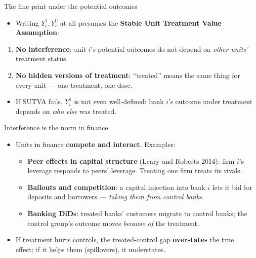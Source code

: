 \documentclass[
  11pt,
  ignorenonframetext,
  aspectratio=169,
]{beamer}
\providecommand{\tightlist}{%
  \setlength{\itemsep}{0pt}\setlength{\parskip}{0pt}}
\begin{document}
\begin{frame}{The fine print under the potential outcomes}
\protect{}\label{the-fine-print-under-the-potential-outcomes}
\begin{itemize}
\tightlist
\item
  Writing \(Y_i^1, Y_i^0\) at all presumes the \textbf{Stable Unit
  Treatment Value Assumption}:
\end{itemize}

\begin{enumerate}
\tightlist
\item
  \textbf{No interference}: unit \(i\)'s potential outcomes do not
  depend on \emph{other units'} treatment status.
\item
  \textbf{No hidden versions of treatment}: ``treated'' means the same
  thing for every unit --- one treatment, one dose.
\end{enumerate}

\begin{itemize}
\tightlist
\item
  If SUTVA fails, \(Y_i^1\) is not even well-defined: bank \(i\)'s
  outcome under treatment depends on \emph{who else} was treated.
\end{itemize}
\end{frame}

\begin{frame}{Interference is the norm in finance}
\protect{}\label{interference-is-the-norm-in-finance}
\begin{itemize}
\tightlist
\item
  Units in finance \textbf{compete and interact}. Examples:

  \begin{itemize}
  \tightlist
  \item
    \textbf{Peer effects in capital structure} (Leary and Roberts 2014):
    firm \(i\)'s leverage responds to peers' leverage. Treating one firm
    treats its rivals.
  \item
    \textbf{Bailouts and competition}: a capital injection into bank
    \(i\) lets it bid for deposits and borrowers --- \emph{taking them
    from control banks}.
  \item
    \textbf{Banking DiDs}: treated banks' customers migrate to control
    banks; the control group's outcome moves \emph{because of} the
    treatment.
  \end{itemize}
\item
  If treatment hurts controls, the treated-control gap
  \textbf{overstates} the true effect; if it helps them (spillovers), it
  understates.
\end{itemize}
\end{frame}
\end{document}
